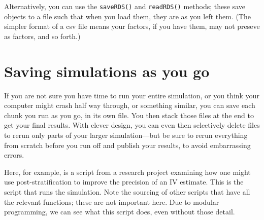 \documentclass[
]{book}
\begin{document}
Alternatively, you can use the \texttt{saveRDS()} and \texttt{readRDS()} methods; these save objects to a file such that when you load them, they are as you left them.
(The simpler format of a csv file means your factors, if you have them, may not preseve as factors, and so forth.)

\hypertarget{saving-simulations-as-you-go}{%
\section{Saving simulations as you go}\label{saving-simulations-as-you-go}}

If you are not sure you have time to run your entire simulation, or you think your computer might crash half way through, or something similar, you can save each chunk you run as you go, in its own file. You then stack those files at the end to get your final results.
With clever design, you can even then selectively delete files to rerun only parts of your larger simulation---but be sure to rerun everything from scratch before you run off and publish your results, to avoid embarrassing errors.

Here, for example, is a script from a research project examining how one might use post-stratification to improve the precision of an IV estimate.
This is the script that runs the simulation.
Note the sourcing of other scripts that have all the relevant functions; these are not important here.
Due to modular programming, we can see what this script does, even without those detail.
\end{document}
